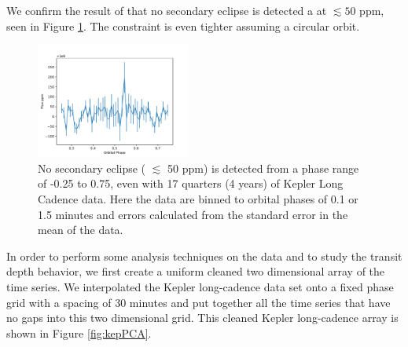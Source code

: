 \documentclass[preprint]{aastex61}
\begin{document}
We confirm the result of \citet{vanWerkhoven2014} that no secondary eclipse is detected a at $\lesssim 50$ ppm, seen in Figure \ref{fig:secEclipse}. 
The constraint is even tighter assuming a circular orbit.

\begin{figure}[!hbtp]
\begin{centering}
\includegraphics[width=0.45\textwidth]{images/kepler/secondary_eclipse.pdf}
\caption{No secondary eclipse ( $\lesssim$ 50 ppm) is detected from a phase range of -0.25 to 0.75, even with 17 quarters (4 years) of Kepler Long Cadence data.
Here the data are binned to orbital phases of 0.1 or 1.5 minutes and errors calculated from the standard error in the mean of the data.
}\label{fig:secEclipse}
\end{centering}
\end{figure}

In order to perform some analysis techniques on the data and to study the transit depth behavior, we first create a uniform cleaned two dimensional array of the time series.
We interpolated the Kepler long-cadence data set onto a fixed phase grid with a spacing of 30 minutes and put together all the time series that have no gaps into this two dimensional grid.
This cleaned Kepler long-cadence array is shown in Figure \ref{fig:kepPCA}.
\end{document}
